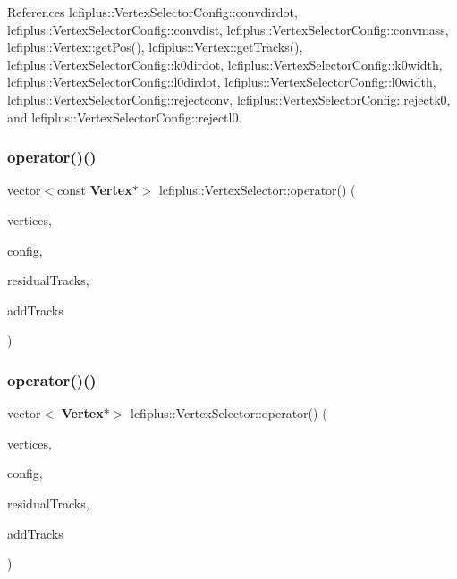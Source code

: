 References lcfiplus\+::\+Vertex\+Selector\+Config\+::convdirdot, lcfiplus\+::\+Vertex\+Selector\+Config\+::convdist, lcfiplus\+::\+Vertex\+Selector\+Config\+::convmass, lcfiplus\+::\+Vertex\+::get\+Pos(), lcfiplus\+::\+Vertex\+::get\+Tracks(), lcfiplus\+::\+Vertex\+Selector\+Config\+::k0dirdot, lcfiplus\+::\+Vertex\+Selector\+Config\+::k0width, lcfiplus\+::\+Vertex\+Selector\+Config\+::l0dirdot, lcfiplus\+::\+Vertex\+Selector\+Config\+::l0width, lcfiplus\+::\+Vertex\+Selector\+Config\+::rejectconv, lcfiplus\+::\+Vertex\+Selector\+Config\+::rejectk0, and lcfiplus\+::\+Vertex\+Selector\+Config\+::rejectl0.

\mbox{\label{classlcfiplus_1_1VertexSelector_afead2a97111f08fcae7405cb2f03446b}} 
\subsubsection{operator()()\hspace{0.1cm}{\footnotesize\ttfamily [1/4]}}
{\footnotesize\ttfamily vector$<$const \textbf{ Vertex}$\ast$$>$ lcfiplus\+::\+Vertex\+Selector\+::operator() (\begin{DoxyParamCaption}\item[{\textbf{ Vertex\+Vec} \&}]{vertices,  }\item[{\textbf{ Vertex\+Selector\+Config} \&}]{config,  }\item[{vector$<$ const \textbf{ Track} $\ast$$>$ \&}]{residual\+Tracks,  }\item[{bool}]{add\+Tracks }\end{DoxyParamCaption})\hspace{0.3cm}{\ttfamily [inline]}}

\mbox{\label{classlcfiplus_1_1VertexSelector_ab60b082f6c482c010f5b120d6709c135}} 
\subsubsection{operator()()\hspace{0.1cm}{\footnotesize\ttfamily [2/4]}}
{\footnotesize\ttfamily vector$<$\textbf{ Vertex}$\ast$$>$ lcfiplus\+::\+Vertex\+Selector\+::operator() (\begin{DoxyParamCaption}\item[{const vector$<$ \textbf{ Vertex} $\ast$$>$ \&}]{vertices,  }\item[{\textbf{ Vertex\+Selector\+Config} \&}]{config,  }\item[{vector$<$ const \textbf{ Track} $\ast$$>$ \&}]{residual\+Tracks,  }\item[{bool}]{add\+Tracks }\end{DoxyParamCaption})\hspace{0.3cm}{\ttfamily [inline]}}

